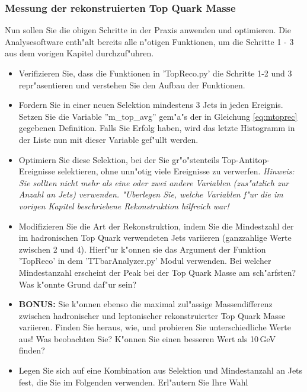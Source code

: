 \subsubsection{Messung der rekonstruierten Top Quark Masse}
Nun sollen Sie die obigen Schritte in der Praxis anwenden und optimieren. Die Analysesoftware enth"alt bereits alle n"otigen Funktionen, um die Schritte 1 - 3 aus dem vorigen Kapitel durchzuf"uhren. 

\begin{itemize}
\item Verifizieren Sie, dass die Funktionen in 'TopReco.py' die Schritte 1-2 und 3 repr"asentieren und verstehen Sie den Aufbau der Funktionen. 

\item Fordern Sie in einer neuen Selektion mindestens 3 Jets in jeden Ereignis. Setzen Sie die Variable ''m\_top\_avg'' gem"a"s der in Gleichung \ref{eq:mtoprec} gegebenen Definition. Falls Sie Erfolg haben, wird das letzte Histogramm in der Liste nun mit dieser Variable gef"ullt werden.

\item Optimiern Sie diese Selektion, bei der Sie gr"o"stenteils Top-Antitop-Ereignisse selektieren, ohne unn"otig viele Ereignisse zu verwerfen. \textit{Hinweis: Sie sollten nicht mehr als eine oder zwei andere Variablen (zus"atzlich zur Anzahl an Jets) verwenden. "Uberlegen Sie, welche Variablen f"ur die im vorigen Kapitel beschriebene Rekonstruktion hilfreich war!}

\item Modifizieren Sie die Art der Rekonstruktion, indem Sie die Mindestzahl der im hadronischen Top Quark verwendeten Jets variieren (ganzzahlige Werte zwischen 2 und 4). Hierf"ur k"onnen sie das Argument der Funktion 'TopReco' in dem 'TTbarAnalyzer.py' Modul verwenden. Bei welcher Mindestanzahl erscheint der Peak bei der Top Quark Masse am sch"arfsten? Was k"onnte Grund daf"ur sein?

\item \textbf{BONUS:} Sie k"onnen ebenso die maximal zul"assige Massendifferenz zwischen hadronischer und leptonischer rekonstruierter Top Quark Masse variieren. Finden Sie heraus, wie, und probieren Sie unterschiedliche Werte aus! Was beobachten Sie? K"onnen Sie einen besseren Wert als 10\,GeV finden?

\item Legen Sie sich auf eine Kombination aus Selektion und Mindestanzahl an Jets fest, die Sie im Folgenden verwenden. Erl"autern Sie Ihre Wahl

\end{itemize}

